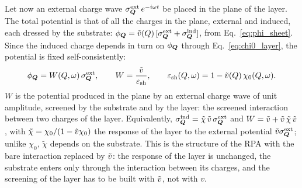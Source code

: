 \documentclass[10pt,a4paper]{paper}
\begin{document}
Let now an external charge wave $\sigma^{\mathrm{ext}}_{\bm{Q}}\,e^{-i\omega t}$ be placed in the plane of the layer.
The total potential is that of all the charges in the plane, external and induced, each dressed by the substrate:
$\phi_{\bm{Q}} = \tilde{v}(Q)\,[\sigma^{\mathrm{ext}}_{\bm{Q}} + \sigma^{\mathrm{ind}}_{\bm{Q}}]$, from Eq.~\eqref{eq:phi_sheet}.
Since the induced charge depends in turn on $\phi_{\bm{Q}}$ through Eq.~\eqref{eq:chi0_layer}, the potential is fixed
self-consistently:
\begin{equation}
\phi_{\bm{Q}} = W(Q,\omega)\,\sigma^{\mathrm{ext}}_{\bm{Q}} , \qquad
W = \frac{\tilde{v}}{\varepsilon_{\mathrm{sh}}} , \qquad
\varepsilon_{\mathrm{sh}}(Q,\omega) = 1 - \tilde{v}(Q)\,\chi_0(Q,\omega) .
\label{eq:eps_sheet}
\end{equation}
$W$ is the potential produced in the plane by an external charge wave of unit amplitude, screened by the substrate
and by the layer: the screened interaction between two charges of the layer. Equivalently,
$\sigma^{\mathrm{ind}}_{\bm{Q}} = \tilde{\chi}\,\tilde{v}\,\sigma^{\mathrm{ext}}_{\bm{Q}}$ and $W = \tilde{v} + \tilde{v}\,\tilde{\chi}\,\tilde{v}$,
with $\tilde{\chi} = \chi_0/(1 - \tilde{v}\chi_0)$ the response of the layer to the external potential
$\tilde{v}\sigma^{\mathrm{ext}}_{\bm{Q}}$; unlike $\chi_0$, $\tilde{\chi}$ depends on the substrate. This is the structure of
the RPA with the bare interaction replaced by $\tilde{v}$: the response of the layer is unchanged, the substrate enters
only through the interaction between its charges, and the screening of the layer has to be built with $\tilde{v}$, not
with $v$.
\end{document}
